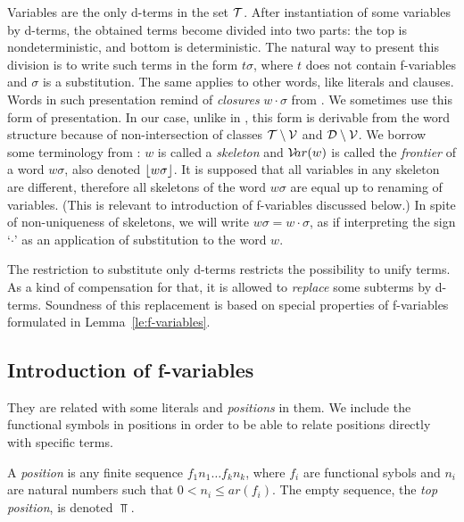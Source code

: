 Variables are the only d-terms in the set ${\cal T}$.  After instantiation of
some variables by d-terms, the obtained terms become divided into two parts:
the top is nondeterministic, and bottom is deterministic.  The natural way to
present this division is to write such terms in the form \(t\sigma\), where
$t$ does not contain f-variables and $\sigma$ is a substitution.  The same
applies to other words, like literals and clauses.  Words in such
presentation remind of {\em closures} \(w\cdot \sigma\) from \cite
{Basic-par}.  We sometimes use this form of presentation.  In our case,
unlike in \cite {Basic-par}, this form is derivable from the word structure
because of non-intersection of classes \({\cal T} \setminus {\cal V}\) and
\({\cal D} \setminus {\cal V}\).  We borrow some terminology from \cite
{Basic-par}: $w$ is called a {\em skeleton} and \({\sl{\cal V}\!ar}(w)\) is called the {\em
frontier} of a word \(w\sigma\), also denoted \(\lfloor w\sigma\rfloor\).  It is
supposed that all variables in any skeleton are different, therefore all
skeletons of the word \(w\sigma\) are equal up to renaming of variables.
(This is relevant to introduction of f-variables discussed below.)  In spite
of non-uniqueness of skeletons, we will write \(w\sigma=w\cdot \sigma\), as
if interpreting the sign `$\cdot $' as an application of substitution to the
word $w$.

The restriction to substitute only d-terms restricts the possibility to
unify terms. As a kind of compensation for that, it is allowed to {\em
replace} some subterms by d-terms.  Soundness of this replacement is based on
special properties of f-variables formulated in Lemma~\ref {le:f-variables}.
%
\subsection{Introduction of f-variables}
%
They are related with some literals and {\em positions} in them.  We include
the functional symbols in positions in order to be able to relate positions
directly with specific terms.

 \begin{definition}\label {def:position}
A {\em position} is any finite sequence \(f_1n_1\ldots f_kn_k\), where $f_i$ are functional sybols and $n_i$ are natural numbers such that \(0< n_i\leq ar(f_i)\).
The empty sequence, the {\em top position}, is denoted \(\Top\).
\end{definition}

